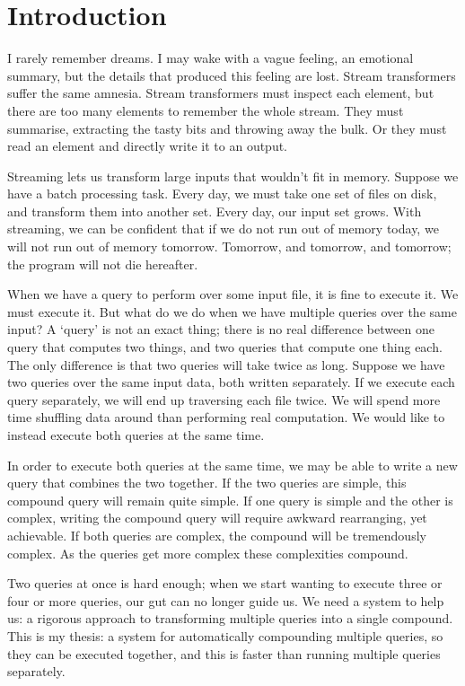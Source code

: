 \chapter{Introduction}
\label{chapter:introduction}

I rarely remember dreams.
I may wake with a vague feeling, an emotional summary, but the details that produced this feeling are lost.
Stream transformers suffer the same amnesia.
Stream transformers must inspect each element, but there are too many elements to remember the whole stream.
They must summarise, extracting the tasty bits and throwing away the bulk.
Or they must read an element and directly write it to an output.

Streaming lets us transform large inputs that wouldn't fit in memory.
Suppose we have a batch processing task.
Every day, we must take one set of files on disk, and transform them into another set.
Every day, our input set grows.
With streaming, we can be confident that if we do not run out of memory today, we will not run out of memory tomorrow.
Tomorrow, and tomorrow, and tomorrow; the program will not die hereafter.

When we have a query to perform over some input file, it is fine to execute it.
We must execute it.
But what do we do when we have multiple queries over the same input?
A `query' is not an exact thing; there is no real difference between one query that computes two things, and two queries that compute one thing each.
The only difference is that two queries will take twice as long.
Suppose we have two queries over the same input data, both written separately.
If we execute each query separately, we will end up traversing each file twice.
We will spend more time shuffling data around than performing real computation.
We would like to instead execute both queries at the same time.

In order to execute both queries at the same time, we may be able to write a new query that combines the two together.
If the two queries are simple, this compound query will remain quite simple.
If one query is simple and the other is complex, writing the compound query will require awkward rearranging, yet achievable.
If both queries are complex, the compound will be tremendously complex.
As the queries get more complex these complexities compound.

Two queries at once is hard enough; when we start wanting to execute three or four or more queries, our gut can no longer guide us.
We need a system to help us: a rigorous approach to transforming multiple queries into a single compound.
This is my thesis: a system for automatically compounding multiple queries, so they can be executed together, and this is faster than running multiple queries separately.

